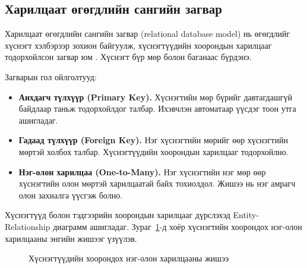 \subsection{Харилцаат өгөгдлийн сангийн загвар}

Харилцаат өгөгдлийн сангийн загвар (relational database model) нь өгөгдлийг хүснэгт хэлбэрээр зохион байгуулж, хүснэгтүүдийн хоорондын харилцааг тодорхойлсон загвар юм \cite{elmasri2015}. Хүснэгт бүр мөр болон баганаас бүрдэнэ.

Загварын гол ойлголтууд:

\begin{itemize}
  \item \textbf{Анхдагч түлхүүр (Primary Key).} Хүснэгтийн мөр бүрийг давтагдашгүй байдлаар таньж тодорхойлдог талбар. Ихэвчлэн автоматаар үүсдэг тоон утга ашигладаг.
  \item \textbf{Гадаад түлхүүр (Foreign Key).} Нэг хүснэгтийн мөрийг өөр хүснэгтийн мөртэй холбох талбар. Хүснэгтүүдийн хоорондын харилцааг тодорхойлно.
  \item \textbf{Нэг-олон харилцаа (One-to-Many).} Нэг хүснэгтийн нэг мөр өөр хүснэгтийн олон мөртэй харилцаатай байх тохиолдол. Жишээ нь нэг амрагч олон захиалга үүсгэж болно.
\end{itemize}

Хүснэгтүүд болон тэдгээрийн хоорондын харилцааг дүрслэхэд Entity-Relationship диаграмм ашигладаг. Зураг~\ref{fig:er-theory}-д хоёр хүснэгтийн хоорондох нэг-олон харилцааны энгийн жишээг үзүүлэв.

\begin{figure}[H]
  \centering
  \caption{Хүснэгтүүдийн хоорондох нэг-олон харилцааны жишээ}
  \label{fig:er-theory}
\end{figure}

